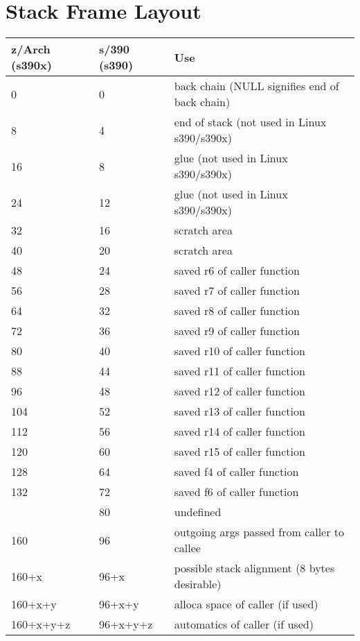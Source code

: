 \section{Stack Frame Layout}
\label{sec:stackframe}
\begin{center}
\begin{tabular}{|l|l|l|}
\hline
z/Arch (s390x) & s/390 (s390) & Use \\
\hline\hline
0            & 0        & back chain (NULL signifies end of back chain)\\
8            & 4        & end of stack (not used in Linux s390/s390x)\\
16           & 8        & glue (not used in Linux s390/s390x)\\
24           & 12       & glue (not used in Linux s390/s390x)\\
32           & 16       & scratch area\\
40           & 20       & scratch area\\
48           & 24       & saved r6 of caller function\\
56           & 28       & saved r7 of caller function\\
64           & 32       & saved r8 of caller function\\
72           & 36       & saved r9 of caller function\\
80           & 40       & saved r10 of caller function\\
88           & 44       & saved r11 of caller function\\
96           & 48       & saved r12 of caller function\\
104          & 52       & saved r13 of caller function\\
112          & 56       & saved r14 of caller function\\
120          & 60       & saved r15 of caller function\\
128          & 64       & saved f4 of caller function\\
132          & 72       & saved f6 of caller function\\
             & 80       & undefined\\
160          & 96       & outgoing args passed from caller to callee\\
160+x        & 96+x     & possible stack alignment (8 bytes desirable)\\
160+x+y      & 96+x+y   & alloca space of caller (if used)\\
160+x+y+z    & 96+x+y+z & automatics of caller (if used)\\
\hline
\end{tabular}
\end{center}
\cbend

